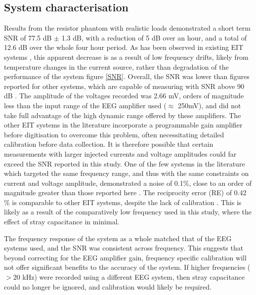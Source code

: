 \subsection{System characterisation}
Results from the resistor phantom with realistic loads demonstrated a short term SNR of 77.5 dB $\pm$ 1.3 dB, with a reduction of 5 dB over an hour, and a total of 12.6 dB over the whole four hour period. As has  been observed in existing EIT systems \cite{oh2007multi}, this apparent decrease is as a result of low frequency drifts, likely from temperature changes in the current source, rather than degradation of the performance of the system figure \ref{SNR}. Overall, the SNR was lower than figures reported for other systems, which are capable of measuring with SNR above 90 dB \cite{khan,Hun_Wi_2014}. The amplitude of the voltages recorded was 2.66 mV, orders of magnitude less than the input range of the EEG amplifier used ($\approx$ 250mV), and did not take full advantage of the high dynamic range offered by these amplifiers. The other EIT systems in the literature incorporate a programmable gain amplifier before digitisation to overcome this problem, often necessitating detailed calibration before data collection. It is therefore possible that certain measurements with larger injected currents and voltage amplitudes could far exceed the SNR reported in this study. One of the few systems in the literature which targeted the same frequency range, and thus with the same constraints on current and voltage amplitude, demonstrated a noise of 0.1\%, close to an order of magnitude greater than those reported here \cite{McEwan_2006}. The reciprocity error (RE) of 0.42 \% is comparable to other EIT systems, despite the lack of calibration \cite{oh2007multi,Hun_Wi_2014,khan}. This is likely as a result of the comparatively low frequency used in this study, where the effect of stray capacitance in minimal.  

The frequency response of the system as a whole matched that of the EEG systems used, and the SNR was consistent across frequency. This suggests that beyond correcting for the EEG amplifier gain, frequency specific calibration will not offer significant benefits to the accuracy of the system. If higher frequencies ($>20$ kHz) were recorded using a different EEG system, then stray capacitance could no longer be ignored, and calibration would likely be required. 
